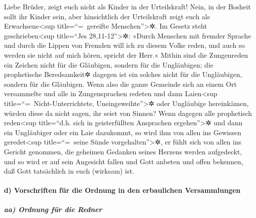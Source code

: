  Liebe Brüder, zeigt euch nicht als Kinder in der
Urteilskraft! Nein, in der Bosheit sollt ihr Kinder sein, aber
hinsichtlich der Urteilskraft zeigt euch als Erwachsene\textless sup
title=``=~gereifte Menschen''\textgreater✲.  Im Gesetz
steht geschrieben\textless sup title=``Jes 28,11-12''\textgreater✲:
»Durch Menschen mit fremder Sprache und durch die Lippen von Fremden
will ich zu diesem Volke reden, und auch so werden sie nicht auf mich
hören, spricht der Herr.«  Mithin sind die Zungenreden
ein Zeichen nicht für die Gläubigen, sondern für die Ungläubigen; die
prophetische Beredsamkeit✲ dagegen ist ein solches nicht für die
Ungläubigen, sondern für die Gläubigen.  Wenn also die
ganze Gemeinde sich an einem Ort versammelte und alle in Zungensprachen
redeten und dann Laien\textless sup title=``=~Nicht-Unterrichtete,
Uneingeweihte''\textgreater✲ oder Ungläubige hereinkämen, würden diese
da nicht sagen, ihr seiet von Sinnen?  Wenn dagegen alle
prophetisch reden\textless sup title=``d.h. sich in geisterfüllten
Ansprachen ergehen''\textgreater✲ und dann ein Ungläubiger oder ein Laie
dazukommt, so wird ihm von allen ins Gewissen geredet\textless sup
title=``=~seine Sünde vorgehalten''\textgreater✲, er fühlt sich von
allen ins Gericht genommen,  die geheimen Gedanken seines
Herzens werden aufgedeckt, und so wird er auf sein Angesicht fallen und
Gott anbeten und offen bekennen, daß Gott tatsächlich in euch (wirksam)
ist.

\hypertarget{d-vorschriften-fuxfcr-die-ordnung-in-den-erbaulichen-versammlungen}{%
\paragraph{d) Vorschriften für die Ordnung in den erbaulichen
Versammlungen}\label{d-vorschriften-fuxfcr-die-ordnung-in-den-erbaulichen-versammlungen}}

\hypertarget{aa-ordnung-fuxfcr-die-redner}{%
\subparagraph{aa) Ordnung für die
Redner}\label{aa-ordnung-fuxfcr-die-redner}}

